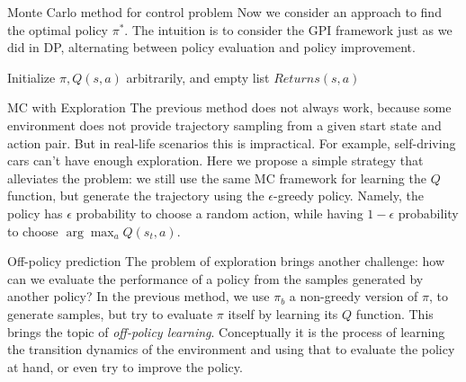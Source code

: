 \documentclass[handout]{beamer}
\begin{document}
\begin{frame}{Monte Carlo method for control problem}
\small
Now we consider an approach to find the optimal policy $\pi^*$.
The intuition is to consider the GPI framework just as we did in DP, alternating between policy evaluation and policy improvement.

\begin{algorithm}[H]
	\caption{First-visit MC Control}
	Initialize $\pi, Q(s, a)$ arbitrarily, and empty list $Returns(s, a)$
	
\end{algorithm}
\end{frame}
\begin{frame}{MC with Exploration}
\small
The previous method does not always work, because some environment does not provide trajectory sampling from a given start state and action pair. But in real-life scenarios this is impractical. For example, self-driving cars can't have enough exploration. 
\vspace{0.3cm}
Here we propose a simple strategy that alleviates the problem: we still use the same MC framework for learning the $Q$ function, but generate the trajectory using the $\epsilon$-greedy policy. Namely, the policy has $\epsilon$ probability to choose a random action, while having $1-\epsilon$ probability to choose $\arg\max_a Q(s_t, a)$.

\end{frame}

\begin{frame}{Off-policy prediction}
\small
The problem of exploration brings another challenge: how can we evaluate the performance of a policy from the samples generated by another policy? In the previous method, we use $\pi_b$ a non-greedy version of $\pi$, to generate samples, but try to evaluate $\pi$ itself by learning its $Q$ function.
\vspace{0.3cm}
This brings the topic of \textit{off-policy learning}. Conceptually it is the process of learning the transition dynamics of the environment and using that to evaluate the policy at hand, or even try to improve the policy.
\end{frame}
\end{document}
